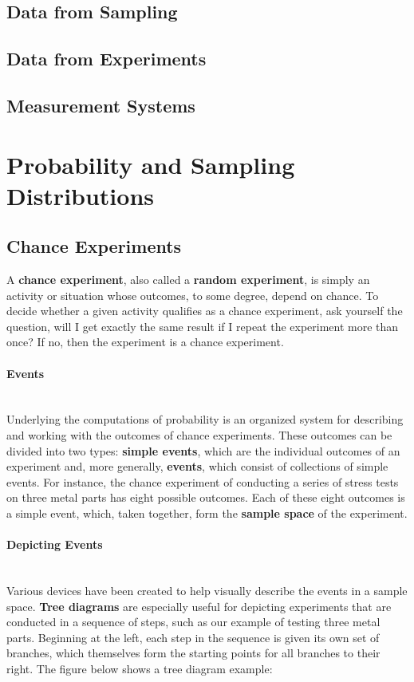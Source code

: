 \documentclass{article}
\newcommand{\p}[1]{\paragraph{#1}} %
\begin{document}
	\subsection{Data from Sampling} %
	
	\subsection{Data from Experiments} %
	
	\subsection{Measurement Systems} %

\clearpage	
\section{Probability and Sampling Distributions} %

	\subsection{Chance Experiments} %
	A \textbf{chance experiment}, also called a \textbf{random experiment}, is simply an activity or 
	situation whose outcomes, to some degree, depend on chance. To decide whether a given 
	activity qualifies as a chance experiment, ask yourself the question, will I get exactly the same 
	result if I repeat the experiment more than once? If no, then the experiment is a chance 
	experiment.
	
	\p{Events} ~\\
	Underlying the computations of probability is an organized system for describing and working 
	with the outcomes of chance experiments. These outcomes can be divided into two types: 
	\textbf{simple events}, which are the individual outcomes of an experiment and, more generally, 
	\textbf{events}, which consist of collections of simple events. For instance, the chance 
	experiment of conducting a series of stress tests on three metal parts has eight possible 
	outcomes. Each of these eight outcomes is a simple event, which, taken together, form the 
	\textbf{sample space} of the experiment.
	
	\p{Depicting Events} ~\\
	Various devices have been created to help visually describe the events in a sample space. 
	\textbf{Tree diagrams} are especially useful for depicting experiments that are conducted in a 
	sequence of steps, such as our example of testing three metal parts. Beginning at the left, each 
	step in the sequence is given its own set of branches, which themselves form the starting points 
	for all branches to their right. The figure below shows a tree diagram example:
	
\end{document}
